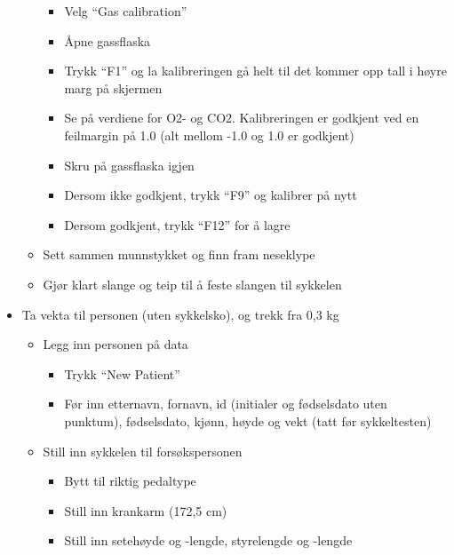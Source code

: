 \documentclass[
  letterpaper,
  DIV=11,
  numbers=noendperiod]{scrartcl}
\providecommand{\tightlist}{%
  \setlength{\itemsep}{0pt}\setlength{\parskip}{0pt}}\usepackage{longtable,booktabs,array}
\begin{document}
\begin{itemize}
\begin{itemize}
    \begin{itemize}
    \tightlist
    \item
      Velg ``Gas calibration''
    \item
      Åpne gassflaska
    \item
      Trykk ``F1'' og la kalibreringen gå helt til det kommer opp tall i
      høyre marg på skjermen
    \item
      Se på verdiene for O2- og CO2. Kalibreringen er godkjent ved en
      feilmargin på 1.0 (alt mellom -1.0 og 1.0 er godkjent)
    \item
      Skru på gassflaska igjen
    \item
      Dersom ikke godkjent, trykk ``F9'' og kalibrer på nytt
    \item
      Dersom godkjent, trykk ``F12'' for å lagre
    \end{itemize}
  \item
    Sett sammen munnstykket og finn fram neseklype
  \item
    Gjør klart slange og teip til å feste slangen til sykkelen
  \end{itemize}
\item
  Ta vekta til personen (uten sykkelsko), og trekk fra 0,3 kg

  \begin{itemize}
  \tightlist
  \item
    Legg inn personen på data

    \begin{itemize}
    \tightlist
    \item
      Trykk ``New Patient''
    \item
      Før inn etternavn, fornavn, id (initialer og fødselsdato uten
      punktum), fødselsdato, kjønn, høyde og vekt (tatt før
      sykkeltesten)
    \end{itemize}
  \item
    Still inn sykkelen til forsøkspersonen

    \begin{itemize}
    \tightlist
    \item
      Bytt til riktig pedaltype
    \item
      Still inn krankarm (172,5 cm)
    \item
      Still inn setehøyde og -lengde, styrelengde og -lengde


\end{itemize}
\end{itemize}
\end{itemize}
\end{document}
